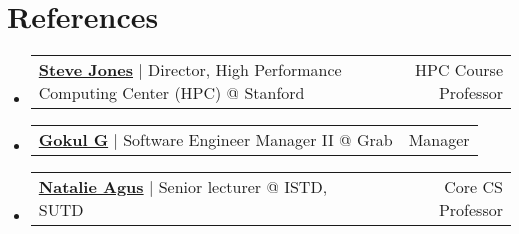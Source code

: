 \documentclass[letterpaper,11pt]{article}
\makeatletter
\newcommand{\resumeItem}[1]{
  \item\small{
    {#1 \vspace{-2.5pt}}
  }
}
\newcommand{\resumeProjectHeading}[2]{
    \item
    \begin{tabular*}{0.97\textwidth}{l@{\extracolsep{\fill}}r}
      \small#1 & \footnotesize#2 \\
    \end{tabular*}\vspace{-7pt}
}
\newcommand{\resumeSubHeadingListStart}{\begin{itemize}[leftmargin=0.15in, label={}]}
\newcommand{\resumeSubHeadingListEnd}{\end{itemize}}
\newcommand{\resumeItemListStart}{\begin{itemize}}
\newcommand{\resumeItemListEnd}{\end{itemize}\vspace{-5pt}}
\makeatother
\begin{document}
        

       



          
         


     

\section{References}

\resumeSubHeadingListStart

        \resumeProjectHeading
        {\textbf{{\href{https://www.linkedin.com/in/hpcclusters/}{{\faLink} Steve Jones}}} $|$ {Director, High Performance Computing Center (HPC) @ Stanford}}{HPC Course Professor}

        
        \resumeProjectHeading
        {\textbf{{\href{https://drive.google.com/file/d/19mpC9rTTXA7rkGL0SHyaICR1O5yjM18b/view?usp=sharing}{{\faLink} Gokul G}}} $|$ {Software Engineer Manager II @ Grab}}{Manager}

        \resumeProjectHeading
        {\textbf{{\href{mailto:natalie_agus@sutd.edu.sg}{{\faLink} Natalie Agus}}} $|$ {Senior lecturer @ ISTD, SUTD}} { Core CS Professor}



    \resumeSubHeadingListEnd
\end{document}
